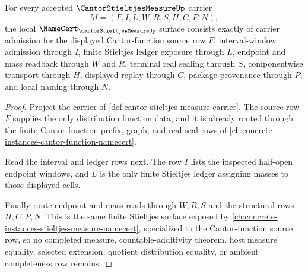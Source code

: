 \begin{theorem}
\label{thm:cantor-stieltjes-measure-namecert-obligations}
For every accepted $\CantorStieltjesMeasureUp$ carrier
$$
M=(F,I,L,W,R,S,H,C,P,N),
$$
the local $\NameCert_{\CantorStieltjesMeasureUp}$ surface consists exactly of carrier admission for the displayed Cantor-function source row $F$, interval-window admission through $I$, finite Stieltjes ledger exposure through $L$, endpoint and mass readback through $W$ and $R$, terminal real sealing through $S$, componentwise transport through $H$, displayed replay through $C$, package provenance through $P$, and local naming through $N$.
\end{theorem}
\begin{proof}
Project the carrier of \autoref{def:cantor-stieltjes-measure-carrier}. The source row $F$ supplies the only distribution function data, and it is already routed through the finite Cantor-function prefix, graph, and real-seal rows of \autoref{ch:concrete-instances-cantor-function-namecert}.

Read the interval and ledger rows next. The row $I$ lists the inspected half-open endpoint windows, and $L$ is the only finite Stieltjes ledger assigning masses to those displayed cells.

Finally route endpoint and mass reads through $W,R,S$ and the structural rows $H,C,P,N$. This is the same finite Stieltjes surface exposed by \autoref{ch:concrete-instances-stieltjes-measure-namecert}, specialized to the Cantor-function source row, so no completed measure, countable-additivity theorem, host measure equality, selected extension, quotient distribution equality, or ambient completeness row remains.
\end{proof}

